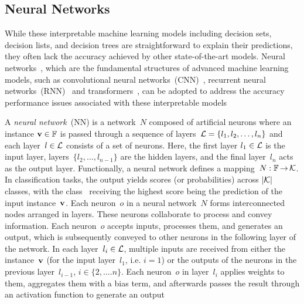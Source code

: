 \subsection{Neural Networks} \label{sec:nn}
While these interpretable machine learning models including decision sets,
decision lists, and decision trees are straightforward to explain their predictions,
they often lack the accuracy achieved by other state-of-the-art models.
%
Neural networks~\cite{schm-nn15}, which are the fundamental structures of
advanced machine learning models, such as convolutional neural
networks~(CNN)~\cite{kun-bc80,lbbh-ieee98}, recurrent neural
networks~(RNN)~\cite{elman-cs90} and transformers~\cite{transformer-17},
can be adopted to address the accuracy performance issues
associated with these interpretable models

A \emph{neural network}~(NN) is a network~$N$ composed of
artificial neurons where an instance $\mathbf{v}\in\mathbb{F}$ is
passed through a sequence of layers~${\mathcal{L}} = \{l_1, l_2, \dots, l_n\}$
and each layer~$l\in{\mathcal{L}}$ consists of a set of neurons.
%
Here, the first layer $l_1 \in {\mathcal{L}}$ is the input layer,
layers~$\{l_2, \dots, l_{n-1}\}$ are the hidden layers, and the final
layer~$l_n$ acts as the output layer.
%
Functionally, a neural network defines a mapping~$N: \mathbb{F} \operatorname*{\rightarrow} {\mathcal{K}}$.
%
In classification tasks, the output yields scores (or probabilities)
across $|{\mathcal{K}}|$ classes, with the class~ receiving the highest
score being the prediction of the input instance~$\mathbf{v}$.
%
Each neuron~$o$ in a neural network~$N$ forms interconnected
nodes arranged in layers.
%
These neurons collaborate to process and convey information.
%
Each neuron~$o$ accepts inputs, processes them, and generates an output,
which is subsequently conveyed to other neurons in the following layer of
the network.
%
In each layer~$l_i \in {\mathcal{L}}$, multiple inputs are received from either the
instance~$\mathbf{v}$ (for the input layer~$l_1$, i.e. $i=1$) or
the outputs of the neurons in the previous layer~$l_{i-1}$,
$i \in \{2, \dots. n\}$.
%
Each neuron~$o$ in layer~$l_i$ applies weights to them, aggregates them
with a bias term,
and afterwards passes the result through an activation function
to generate an output~

